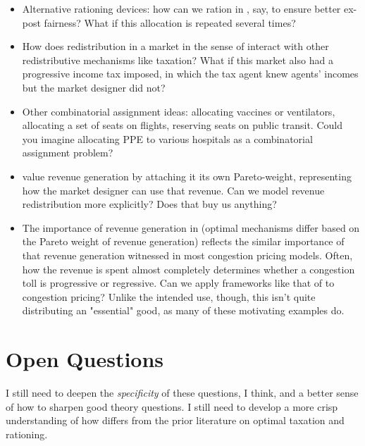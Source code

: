 \documentclass[JEL]{AEA}
\begin{document}
\begin{itemize}
    \item Alternative rationing devices: how can we ration in \cite{dworczak-2020}, say, to ensure better ex-post fairness? What if this allocation is repeated several times?
    
    \item How does redistribution in a market in the sense of \cite{dworczak-2020} interact with other redistributive mechanisms like taxation? What if this market also had a progressive income tax imposed, in which the tax agent knew agents' incomes but the market designer did not?
    
    \item Other combinatorial assignment ideas: allocating vaccines or ventilators, allocating a set of seats on flights, reserving seats on public transit. Could you imagine allocating PPE to various hospitals as a combinatorial assignment problem?
    
    \item \cite{akbarpour-2020} value revenue generation by attaching it its own Pareto-weight, representing how the market designer can use that revenue. Can we model revenue redistribution more explicitly? Does that buy us anything?
    
    \item The importance of revenue generation in \cite{akbarpour-2020} (optimal mechanisms differ based on the Pareto weight of revenue generation) reflects the similar importance of that revenue generation witnessed in most congestion pricing models. Often, how the revenue is spent almost completely determines whether a congestion toll is progressive or regressive. Can we apply frameworks like that of \cite{akbarpour-2020} to congestion pricing? Unlike the intended use, though, this isn't quite distributing an "essential" good, as many of these motivating examples do.
\end{itemize}

\section{Open Questions}

I still need to deepen the \emph{specificity} of these questions, I think, and a better sense of how to sharpen good theory questions. I still need to develop a more crisp understanding of how \cite{dworczak-2020} differs from the prior literature on optimal taxation and rationing.
\end{document}
